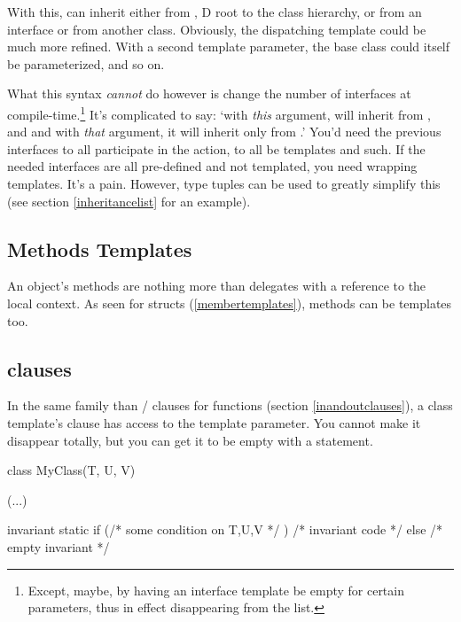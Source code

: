 With this,  can inherit either from , D root to the class hierarchy, or from an interface or from another class. Obviously, the dispatching template could be much more refined. With a second template parameter, the base class could itself be parameterized, and so on.

What this syntax \emph{cannot} do however is change the number of interfaces at compile-time.\footnote{ Except, maybe, by having an interface template be empty for certain parameters, thus in effect disappearing from the list.} It's complicated to say: `with \emph{this} argument,  will inherit from ,  and  and with \emph{that} argument, it will inherit only from .' You'd need the previous interfaces to all participate in the action, to all be templates and such. If the needed interfaces are all pre-defined and not templated, you need wrapping templates. It's a pain. However, type tuples can be used to greatly simplify this (see section \ref{inheritancelist} for an example).

\subsection{Methods Templates}\label{methodtemplates}

An object's methods are nothing more than delegates with a reference to the local  context. As seen for structs (\ref{membertemplates}), methods can be templates too.


\subsection{ clauses}\label{class:invariant}

In the same family than / clauses for functions (section \ref{inandoutclauses}), a class template's  clause has access to the template parameter. You cannot make it disappear totally, but you can get it to be empty with a  statement.

\begin{dcode}
class MyClass(T, U, V)
{
    (...)

    invariant
    {
        static if (/* some condition on T,U,V */ )
        {
            /* invariant code */
        }
        else
        { /* empty invariant */ }
    }
}
\end{dcode}

